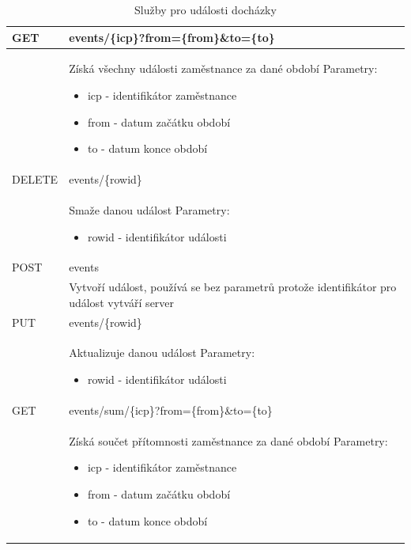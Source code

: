 \documentclass{diplomka}
\begin{document}
\renewcommand{\arraystretch}{1.5}
\begin{table}[H]
\begin{center}
\begin{tabular}{| m{2cm} |  m{10cm} |}
\hline
\rowcolor{Gray}
GET & events/\{icp\}?from=\{from\}\&to=\{to\} \\ \hline
&  \parbox{10cm}{Získá všechny události zaměstnance za dané období\\
Parametry:\begin{itemize}[noitemsep,nolistsep]
\item icp - identifikátor zaměstnance
\item from - datum začátku období
\item to - datum konce období
\end{itemize}} \\ \hline
{}
DELETE  & events/\{rowid\} \\  \hline
&  \parbox{10cm}{Smaže danou událost\\
Parametry:\begin{itemize}[noitemsep,nolistsep]
\item rowid - identifikátor události
\end{itemize}} \\ \hline
{}
POST  & events \\  \hline
&  \parbox{10cm}{Vytvoří událost, používá se bez parametrů protože identifikátor pro událost vytváří server
} \\ \hline
{}
PUT  & events/\{rowid\} \\ 
&  \parbox{10cm}{Aktualizuje danou událost\\
Parametry:\begin{itemize}[noitemsep,nolistsep]
\item rowid - identifikátor události
\end{itemize}} \\ \hline
{}
GET & events/sum/\{icp\}?from=\{from\}\&to=\{to\} \\ \hline
&  \parbox{10cm}{Získá součet přítomnosti zaměstnance za dané období\\
Parametry:\begin{itemize}[noitemsep,nolistsep]
\item icp - identifikátor zaměstnance
\item from - datum začátku období
\item to - datum konce období
\end{itemize}} \\ \hline
\end{tabular}
\end{center}
\caption{Služby pro události docházky}
\label{tab:urievents}
\end {table}
\end{document}

